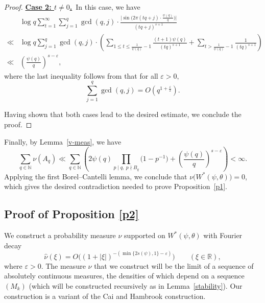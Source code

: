 \documentclass[12pt,a4paper,twoside]{article}
\begin{document}
\begin{proof}
\underline{\textbf{Case 2: $t \ne 0$.}}~In this case, we have
\begin{align*}
&\log q \sum_{t=1}^{\infty}\sum_{j=1}^{q} \gcd(q,j) \cdot  \frac{\bigl| \sin\bigl(2\pi (tq+j) \cdot \frac{\psi(q)}{q}\bigr) \bigr|}{(tq+j)^{s+1}}\\
\ll& \log q \sum_{j=1}^{q} \gcd(q,j) \cdot\left(\sum_{1\le t\le \frac{1}{\psi(q)}-1}\frac{(t+1)\psi(q)}{(tq)^{s+1}}+\sum_{t>\frac{1}{\psi(q)}-1}\frac{1}{(tq)^{s+1}}\right)\\
\ll & \left(\frac{\psi(q)}{q}\right)^{s-\varepsilon},
\end{align*}
where the last inequality follows from \cite[Theorem 3.2]{B01} that for all $\varepsilon>0,$
\[\sum_{j=1}^{q} \gcd(q,j)=O(q^{1+\frac{\varepsilon}{2}}).\]


Having shown that both cases lead to the desired estimate, we conclude the proof.

\end{proof}




Finally, by Lemma~\ref{v-meas}, we have
\[
\sum_{q\in\mathbb{N}} \nu(A_q) \ll \sum_{q\in\mathbb{N}} \left( 2\psi(q) \prod_{ {p\mid q,~p\nmid B_q}} \bigl(1 - p^{-1}\bigr) + \left(\frac{\psi(q)}{q}\right)^{s-\varepsilon} \right) < \infty.
\]
Applying the first Borel–Cantelli lemma, we conclude that \(\nu\bigl(W^{\ast}(\psi,\theta)\bigr) = 0\), which gives the desired contradiction needed to prove Proposition~\ref{p1}.











\subsection{Proof of Proposition \ref{p2}}


We construct a probability measure $\nu$ supported on $W^{\ast}(\psi,\theta)$ with Fourier decay
\[
\widehat{\nu}(\xi)=O\bigl((1+|\xi|)^{-(\min\{2s(\psi),1\}-\varepsilon)}\bigr) \qquad (\xi \in \mathbb{R}),
\]
where $\varepsilon>0$. The measure \(\nu\) that we construct will be the limit of a sequence of absolutely continuous measures, the densities of which depend on a sequence \((M_k)\) (which will be constructed recursively as in Lemma~\ref{stability}). Our construction is a variant of the Cai and Hambrook construction.
\end{document}
